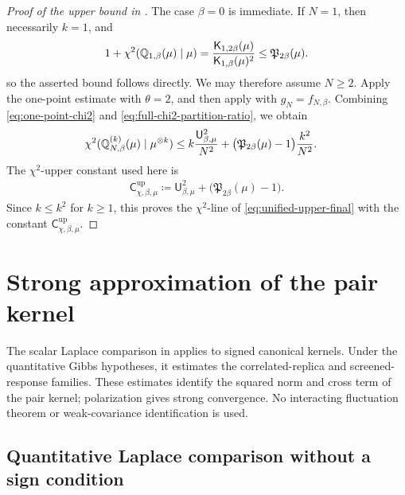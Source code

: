 \documentclass[11pt,reqno]{amsart}
\numberwithin{equation}{section}
\theoremstyle{plain}
\theoremstyle{remark}
\DeclarePairedDelimiter{\pa}{\lparen}{\rparen}
\newcommand{\Q}{{\mathbb{Q}}}
\newcommand{\K}{{\mathsf{K}}}
\newcommand{\be}{\beta}
\newcommand{\Chi}{\chi^2}
\begin{document}
\begin{proof}[Proof of the upper bound in ]
The case \(\be=0\) is immediate.  If \(N=1\), then necessarily \(k=1\), and
\begin{align}\label{eq:N1-full-chi2-bound}
 1+\Chi\pa{\Q_{1,\be}(\mu)\mid\mu}
 =\frac{\K_{1,2\be}(\mu)}{\K_{1,\be}(\mu)^2}
 \le \mathfrak P_{2\be}(\mu).
\end{align}
so the asserted bound follows directly.  We may therefore assume \(N\ge2\).  Apply the one-point estimate with \(\theta=2\), and then apply  with \(g_N=f_{N,\be}\).  Combining \eqref{eq:one-point-chi2} and \eqref{eq:full-chi2-partition-ratio}, we obtain
\begin{align}
\Chi\pa{\Q_{N,\be}^{(k)}(\mu)\mid\mu^{\otimes k}}
&\le k\frac{\mathsf U_{\be,\mu}^2}{N^2}
+\bigl(\mathfrak P_{2\be}(\mu)-1\bigr)\frac{k^2}{N^2}.
\end{align}
The \(\chi^2\)-upper constant used here is
\begin{align}\label{eq:chi-upper-constant}
 \mathsf C_{\chi,\be,\mu}^{\mathrm{up}}
 \coloneqq \mathsf U_{\be,\mu}^2+\bigl(\mathfrak P_{2\be}(\mu)-1\bigr).
\end{align}
Since \(k\le k^2\) for \(k\ge1\), this proves the \(\chi^2\)-line of \eqref{eq:unified-upper-final}
with the constant \(\mathsf C_{\chi,\be,\mu}^{\mathrm{up}}\).
\end{proof}

\section{Strong approximation of the pair kernel}
\label{sec:second-hoeffding-component}

The scalar Laplace comparison in 
applies to signed canonical kernels.  Under the quantitative Gibbs
hypotheses, it estimates the correlated-replica and screened-response
families.  These estimates identify the squared norm and cross term of
the pair kernel; polarization gives strong convergence.  No interacting fluctuation theorem or weak-covariance identification is used.

\subsection{Quantitative Laplace comparison without a sign condition}
\label{subsec:signed-scalar-Laplace}
\end{document}
